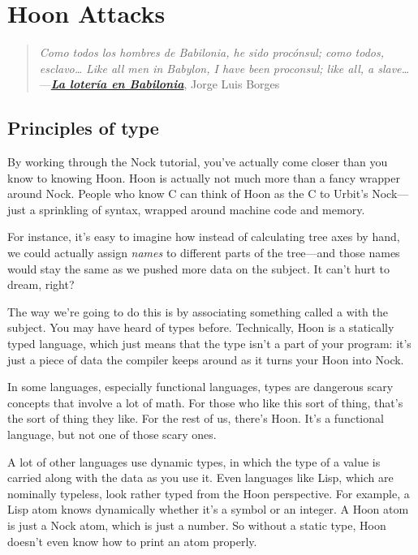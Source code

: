 \chapter{Hoon Attacks}

\begin{quote}
\noindent \emph{Como todos los hombres de Babilonia, he sido procónsul;
como todos, esclavo\ldots}
\bigskip \newline
\noindent \emph{Like all men in Babylon, I have been proconsul;
like all, a slave\ldots}
\medskip \newline
---\href{https://en.wikipedia.org/wiki/The_Lottery_in_Babylon}{\textbf{\emph{La lotería en Babilonia}}}, Jorge Luis Borges
\end{quote}

\section{Principles of type}

By working through the Nock tutorial, you've actually come closer
than you know to knowing Hoon.  Hoon is actually not much more
than a fancy wrapper around Nock. People who know C can think of
Hoon as the C to Urbit's Nock---just a sprinkling of syntax,
wrapped around machine code and memory.

For instance, it's easy to imagine how instead of calculating
tree axes by hand, we could actually assign \emph{names} to different
parts of the tree---and those names would stay the same as we
pushed more data on the subject.  It can't hurt to dream, right?

The way we're going to do this is by associating something called
a  with the subject.  You may have heard of types before.
Technically, Hoon is a statically typed language, which just
means that the type isn't a part of your program: it's just a
piece of data the compiler keeps around as it turns your Hoon
into Nock.

In some languages, especially functional languages, types are
dangerous scary concepts that involve a lot of math.  For those
who like this sort of thing, that's the sort of thing they like.
For the rest of us, there's Hoon. It's a functional language, but
not one of those scary ones.

A lot of other languages use dynamic types, in which the type of
a value is carried along with the data as you use it.  Even
languages like Lisp, which are nominally typeless, look rather
typed from the Hoon perspective.  For example, a Lisp atom knows
dynamically whether it's a symbol or an integer.  A Hoon atom is
just a Nock atom, which is just a number.  So without a static
type, Hoon doesn't even know how to print an atom properly.

